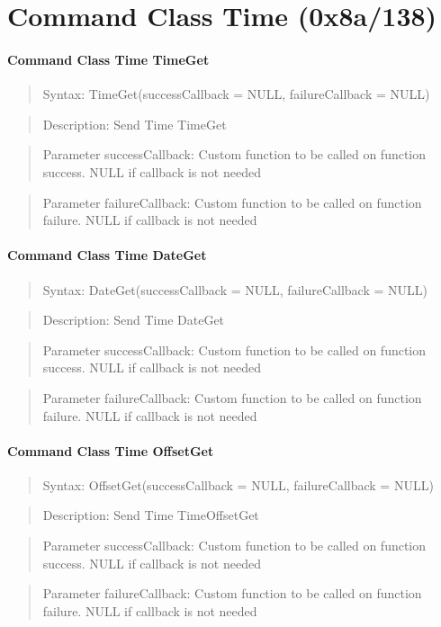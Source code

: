 \section{Command Class Time (0x8a/138)} 
 
  
\paragraph {Command Class Time TimeGet}
\begin{quote} Syntax: TimeGet(successCallback = NULL, failureCallback = NULL)\end{quote}
\begin{quote} Description: Send Time TimeGet\end{quote}
\begin{quote} Parameter successCallback: Custom function to be called on function success. NULL if callback is not needed\end{quote}
\begin{quote} Parameter failureCallback: Custom function to be called on function failure. NULL if callback is not needed\end{quote}

\paragraph {Command Class Time DateGet}
\begin{quote} Syntax: DateGet(successCallback = NULL, failureCallback = NULL)\end{quote}
\begin{quote} Description: Send Time DateGet\end{quote}
\begin{quote} Parameter successCallback: Custom function to be called on function success. NULL if callback is not needed\end{quote}
\begin{quote} Parameter failureCallback: Custom function to be called on function failure. NULL if callback is not needed\end{quote}

\paragraph {Command Class Time OffsetGet}
\begin{quote} Syntax: OffsetGet(successCallback = NULL, failureCallback = NULL)\end{quote}
\begin{quote} Description: Send Time TimeOffsetGet\end{quote}
\begin{quote} Parameter successCallback: Custom function to be called on function success. NULL if callback is not needed\end{quote}
\begin{quote} Parameter failureCallback: Custom function to be called on function failure. NULL if callback is not needed\end{quote}

